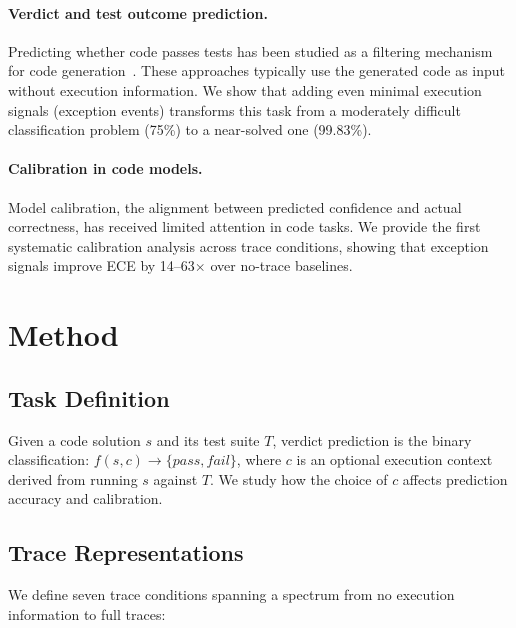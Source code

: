 \documentclass[11pt,a4paper]{article}
\begin{document}
\paragraph{Verdict and test outcome prediction.}
Predicting whether code passes tests has been studied as a filtering mechanism for code generation~\cite{coderanker2023,codet2023}. These approaches typically use the generated code as input without execution information. We show that adding even minimal execution signals (exception events) transforms this task from a moderately difficult classification problem (75\%) to a near-solved one (99.83\%).

\paragraph{Calibration in code models.}
Model calibration, the alignment between predicted confidence and actual correctness, has received limited attention in code tasks. We provide the first systematic calibration analysis across trace conditions, showing that exception signals improve ECE by 14--63$\times$ over no-trace baselines.

\section{Method}
\label{sec:method}

\subsection{Task Definition}

Given a code solution $s$ and its test suite $T$, verdict prediction is the binary classification: $f(s, c) \rightarrow \{pass, fail\}$, where $c$ is an optional execution context derived from running $s$ against $T$. We study how the choice of $c$ affects prediction accuracy and calibration.

\subsection{Trace Representations}

We define seven trace conditions spanning a spectrum from no execution information to full traces:
\end{document}
